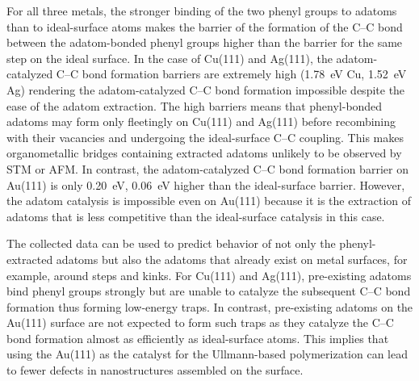 \documentclass[journal=jacsat,manuscript=article]{achemso}
\begin{document}
For all three metals, the stronger binding of the two phenyl groups to adatoms than to ideal-surface atoms makes the barrier of the formation of the C--C bond between the adatom-bonded phenyl groups higher than the barrier for the same step on the ideal surface. In the case of Cu(111) and Ag(111), the adatom-catalyzed C--C bond formation barriers are extremely high (\SI{1.78}{\electronvolt} Cu, \SI{1.52}{\electronvolt} Ag) rendering the adatom-catalyzed C--C bond formation impossible despite the ease of the adatom extraction. The high barriers means that phenyl-bonded adatoms may form only fleetingly on Cu(111) and Ag(111) before recombining with their vacancies and undergoing the ideal-surface C--C coupling. This makes organometallic bridges containing extracted adatoms unlikely to be observed by STM or AFM. In contrast, the adatom-catalyzed C--C bond formation barrier on Au(111) is only \SI{0.20}{\electronvolt}, \SI{0.06}{\electronvolt} higher than the ideal-surface barrier. However, the adatom catalysis is impossible even on Au(111) because it is the extraction of adatoms that is less competitive than the ideal-surface catalysis in this case.

The collected data can be used to predict behavior of not only the phenyl-extracted adatoms but also the adatoms that already exist on metal surfaces, for example, around steps and kinks. For Cu(111) and Ag(111), pre-existing adatoms bind phenyl groups strongly but are unable to catalyze the subsequent C--C bond formation thus forming low-energy traps. In contrast, pre-existing adatoms on the Au(111) surface are not expected to form such traps as they catalyze the C--C bond formation almost as efficiently as ideal-surface atoms. This implies that using the Au(111) as the catalyst for the Ullmann-based polymerization can lead to fewer defects in nanostructures assembled on the surface. %
\end{document}
